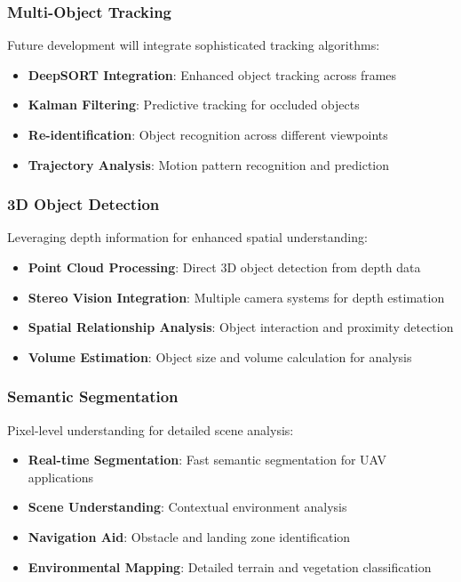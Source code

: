 \documentclass[11pt,a4paper]{article}
\begin{document}
\subsubsection{Multi-Object Tracking}

Future development will integrate sophisticated tracking algorithms:

\begin{itemize}
    \item \textbf{DeepSORT Integration}: Enhanced object tracking across frames
    \item \textbf{Kalman Filtering}: Predictive tracking for occluded objects
    \item \textbf{Re-identification}: Object recognition across different viewpoints
    \item \textbf{Trajectory Analysis}: Motion pattern recognition and prediction
\end{itemize}

\subsubsection{3D Object Detection}

Leveraging depth information for enhanced spatial understanding:

\begin{itemize}
    \item \textbf{Point Cloud Processing}: Direct 3D object detection from depth data
    \item \textbf{Stereo Vision Integration}: Multiple camera systems for depth estimation
    \item \textbf{Spatial Relationship Analysis}: Object interaction and proximity detection
    \item \textbf{Volume Estimation}: Object size and volume calculation for analysis
\end{itemize}

\subsubsection{Semantic Segmentation}

Pixel-level understanding for detailed scene analysis:

\begin{itemize}
    \item \textbf{Real-time Segmentation}: Fast semantic segmentation for UAV applications
    \item \textbf{Scene Understanding}: Contextual environment analysis
    \item \textbf{Navigation Aid}: Obstacle and landing zone identification
    \item \textbf{Environmental Mapping}: Detailed terrain and vegetation classification
\end{itemize}
\end{document}
